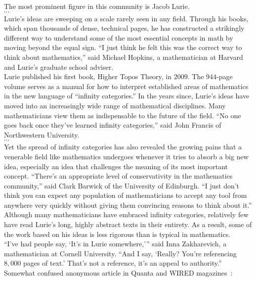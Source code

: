 \documentclass[11pt,openany]{book}
\begin{document}
\begin{boxquote}
The most prominent figure in this community is Jacob Lurie. 
\\
$\cdots$
\\
Lurie’s ideas are sweeping on a scale rarely seen in any field. 
Through his books, which span thousands of dense, technical pages, 
he has constructed a strikingly different way to understand some 
of the most essential concepts in math by moving 
beyond the equal sign. 
``I just think he felt this was the correct way to think 
about mathematics,'' said Michael Hopkins, a mathematician 
at Harvard and Lurie’s graduate school adviser.
\\
Lurie published his first book, Higher Topos Theory, in $2009$. 
The $944$-page volume serves as a manual for how 
to interpret established areas of mathematics 
in the new language of ``infinity categories.'' 
In the years since, Lurie’s ideas have moved 
into an increasingly wide range of mathematical disciplines. 
Many mathematicians view them as indispensable 
to the future of the field. ``No one goes back once they’ve learned 
infinity categories,'' said John Francis of Northwestern University.
\\
$\cdots$
\\
Yet the spread of infinity categories has also revealed 
the growing pains that a venerable field 
like mathematics undergoes whenever it tries 
to absorb a big new idea, especially an idea 
that challenges the meaning of its most important concept. 
``There’s an appropriate level of conservativity 
in the mathematics community,'' 
said Clark Barwick of the University of Edinburgh. 
``I just don’t think you can expect 
any population of mathematicians to accept any tool 
from anywhere very quickly without giving them convincing reasons 
to think about it.''
\\
Although many mathematicians have embraced infinity categories, 
relatively few have read Lurie’s long, highly abstract texts 
in their entirety. As a result, some of the work 
based on his ideas is less rigorous than is typical in mathematics.
\\
``I’ve had people say, ‘It’s in Lurie somewhere,’'' 
said Inna Zakharevich, a mathematician at Cornell University. 
``And I say, ‘Really? You’re referencing $8,000$ pages of text.’ 
That’s not a reference, it’s an appeal to authority.''
\tcblower
{Somewhat confused anonymous article in
Quanta and WIRED 
magazines~\cite{Hartnett:2019:Lurie,Quanta:2019:Lurie}:}
\end{boxquote}
\end{document}
